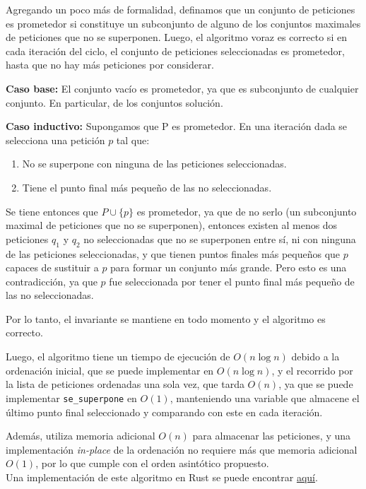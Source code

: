 \documentclass[letterpaper, 12pt]{article}
\begin{document}
\begin{enumerate}
Agregando un poco más de formalidad, definamos que un conjunto de peticiones es prometedor si constituye un subconjunto de alguno de los conjuntos maximales de peticiones que no se superponen. Luego, el algoritmo voraz es correcto si en cada iteración del ciclo, el conjunto de peticiones seleccionadas es prometedor, hasta que no hay más peticiones por considerar.

\textbf{Caso base:} El conjunto vacío es prometedor, ya que es subconjunto de cualquier conjunto. En particular, de los conjuntos solución.

\textbf{Caso inductivo:} Supongamos que P es prometedor. En una iteración dada se selecciona una petición $p$ tal que:

\begin{enumerate}
    \item No se superpone con ninguna de las peticiones seleccionadas.
    \item Tiene el punto final más pequeño de las no seleccionadas.
\end{enumerate}

Se tiene entonces que $P \cup \{p\}$ es prometedor, ya que de no serlo (un subconjunto maximal de peticiones que no se superponen), entonces existen al menos dos peticiones $q_1$ y $q_2$ no seleccionadas que no se superponen entre sí, ni con ninguna de las peticiones seleccionadas, y que tienen puntos finales más pequeños que $p$ capaces de sustituir a $p$ para formar un conjunto más grande. Pero esto es una contradicción, ya que $p$ fue seleccionada por tener el punto final más pequeño de las no seleccionadas.

Por lo tanto, el invariante se mantiene en todo momento y el algoritmo es correcto.

Luego, el algoritmo tiene un tiempo de ejecución de $O(n \log n)$ debido a la ordenación inicial, que se puede implementar en $O(n \log n)$, y el recorrido por la lista de peticiones ordenadas una sola vez, que tarda $O(n)$, ya que se puede implementar \texttt{se\_superpone} en $O(1)$, manteniendo una variable que almacene el último punto final seleccionado y comparando con este en cada iteración.

Además, utiliza memoria adicional $O(n)$ para almacenar las peticiones, y una implementación \emph{in-place} de la ordenación no requiere más que memoria adicional $O(1)$, por lo que cumple con el orden asintótico propuesto. \\

Una implementación de este algoritmo en Rust se puede encontrar \href{https://gitfront.io/r/chrischriscris/swaWSXShzVoW/Tareas-CI5651-EM2024/tree/tarea2/ej1/}{aquí}. \\


\end{enumerate}
\end{document}
